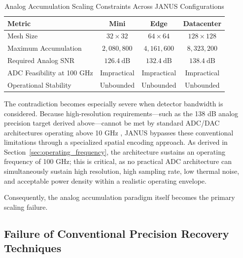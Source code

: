 \documentclass[journal]{IEEEtran}
\begin{document}
\begin{table}[htbp]
\centering
\caption{
Analog Accumulation Scaling Constraints Across JANUS Configurations
}
\label{tab:analog_constraints}
\begin{tabular}{lccc}
\toprule
\textbf{Metric} & \textbf{Mini} & \textbf{Edge} & \textbf{Datacenter} \\
\midrule

Mesh Size & $32 \times 32$ & $64 \times 64$ & $128 \times 128$ \\

Maximum Accumulation & $2{,}080{,}800$ & $4{,}161{,}600$ & $8{,}323{,}200$ \\

Required Analog SNR & $126.4~\mathrm{dB}$ & $132.4~\mathrm{dB}$ & $138.4~\mathrm{dB}$ \\

ADC Feasibility at 100 GHz  & Impractical & Impractical & Impractical \\

Operational Stability & Unbounded & Unbounded & Unbounded \\

\bottomrule
\end{tabular}
\end{table}

The contradiction becomes especially severe when detector bandwidth is considered. Because high-resolution requirements---such as the 138 dB analog precision target derived above---cannot be met by standard ADC/DAC architectures operating above 10 GHz , JANUS bypasses these conventional limitations through a specialized spatial encoding approach. As derived in Section~\ref{sec:operating_frequency}, the architecture sustains an operating frequency of 100 GHz; this is critical, as no practical ADC architecture can simultaneously sustain high resolution, high sampling rate, low thermal noise, and acceptable power density within a realistic operating envelope.

Consequently, the analog accumulation paradigm itself becomes the primary scaling failure.

\subsection{\textbf{Failure of Conventional Precision Recovery Techniques}}
\end{document}
